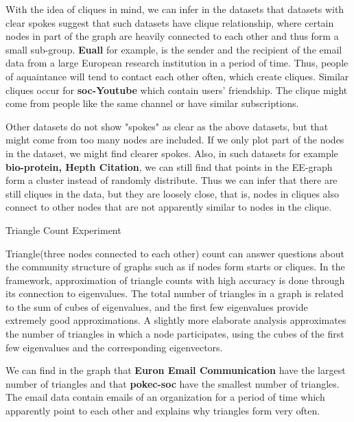With the idea of cliques in mind, we can infer in the datasets that datasets with clear spokes suggest that such datasets have clique relationship, where certain nodes in part of the graph are heavily connected to each other and thus form a small sub-group. \textbf{Euall} for example, is the sender and the recipient of the email data from a large European research institution in a period of time. Thus, people of aquaintance will tend to contact each other often, which create cliques.
Similar cliques occur for \textbf{soc-Youtube} which contain users' friendship. The clique might come from people like the same channel or have similar subscriptions.

Other datasets do not show "spokes" as clear as the above datasets, but that might come from too many nodes are included. If we only plot part of the nodes in the dataset, we might find clearer spokes. Also, in such datasets for example \textbf{bio-protein, Hepth Citation}, we can still find that points in the EE-graph form a cluster instead of randomly distribute. Thus we can infer that there are still cliques in the data, but they are loosely close, that is, nodes in cliques also connect to other nodes that are not apparently similar to nodes in the clique.

Triangle Count Experiment

Triangle(three nodes connected to each other) count can answer questions about the community structure of graphs such as if nodes form starts or cliques. In the framework, approximation of triangle counts with high accuracy is done through its connection to eigenvalues. The total number of triangles in a graph is related to the sum of cubes of eigenvalues, and the first few eigenvalues provide extremely good approximations. A slightly more elaborate analysis approximates the number of triangles in which a node participates, using the cubes of the first few eigenvalues and the corresponding eigenvectors.

We can find in the graph that \textbf{Euron Email Communication} have the largest number of triangles and that \textbf{pokec-soc} have the smallest number of triangles. The email data contain emails of an organization for a period of time which apparently point to each other and explains why triangles form very often.


